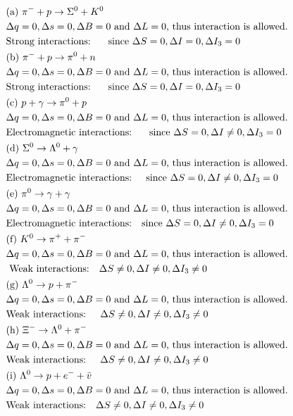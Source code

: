 \begin{answer}
	\begin{align*}
	&\text{(a) $\pi^{-}+p \rightarrow \Sigma^0+K^0$}\\
	&\text{$\Delta q=0, \Delta s=0, \Delta B=0$ and $\Delta L=0$, thus interaction is allowed.}\\
	&\text{Strong interactions: $\quad$ since $\Delta S=0, \Delta I=0, \Delta I_3=0$}\\
	&\text{(b) $\pi^{-}+p \rightarrow \pi^0+n$}\\
	&\text{$\Delta q=0, \Delta s=0, \Delta B=0$ and $\Delta L=0$, thus interaction is allowed.}\\
	&\text{Strong interactions: $\quad$ since $\Delta S=0, \Delta I=0, \Delta I_3=0$}\\
	&\text{(c) $p+\gamma \rightarrow \pi^0+p$}\\
	&\text{$\Delta q=0, \Delta s=0, \Delta B=0$ and $\Delta L=0$, thus interaction is allowed.}\\
	&\text{Electromagnetic interactions: $\quad$ since $\Delta S=0, \Delta I \neq 0, \Delta I_3=0$}\\
	&\text{(d) $\Sigma^0 \rightarrow \Lambda^0+\gamma$}\\
	&\text{$\Delta q=0, \Delta s=0, \Delta B=0$ and $\Delta L=0$, thus interaction is allowed.}\\
	&\text{Electromagnetic interactions: \quad since $\Delta S=0, \Delta I \neq 0, \Delta I_3=0$}\\
	&\text{(e) $\pi^0 \rightarrow \gamma+\gamma$}\\
	&\text{$\Delta q=0, \Delta s=0, \Delta B=0$ and $\Delta L=0$, thus interaction is allowed.}\\
	&\text{Electromagnetic interactions:\quad  since $\Delta S=0, \Delta I \neq 0, \Delta I_3=0$}\\
	&\text{(f) $K^0 \rightarrow \pi^{+}+\pi^{-}$}\\
	&\text{$\Delta q=0, \Delta s=0, \Delta B=0$ and $\Delta L=0$, thus interaction is allowed.}\\
&\text{	Weak interactions:\quad $\Delta S \neq 0, \Delta I \neq 0, \Delta I_3 \neq 0$}\\
&\text{(g) $\Lambda^0 \rightarrow p+\pi^{-}$}\\
&\text{$\Delta q=0, \Delta s=0, \Delta B=0$ and $\Delta L=0$, thus interaction is allowed.}\\
&\text{Weak interactions: $\quad \Delta S \neq 0, \Delta I \neq 0, \Delta I_3 \neq 0$}\\
&\text{(h) $\Xi^{-} \rightarrow \Lambda^0+\pi^{-}$}\\
&\text{$\Delta q=0, \Delta s=0, \Delta B=0$ and $\Delta L=0$, thus interaction is allowed.}\\
&\text{Weak interactions: $\quad \Delta S \neq 0, \Delta I \neq 0, \Delta I_3 \neq 0$}\\
&\text{(i) $\Lambda^0 \rightarrow p+e^{-}+\bar{v}$}\\
&\text{$\Delta q=0, \Delta s=0, \Delta B=0$ and $\Delta L=0$, thus interaction is allowed.}\\
&\text{Weak interactions:\quad$\Delta S \neq 0, \Delta I \neq 0, \Delta I_3 \neq 0$}
	\end{align*}
\end{answer}
